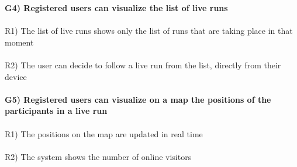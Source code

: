 \textbf{G4) Registered users can visualize the list of live runs} \\ \\
R1) The list of live runs shows only the list of runs that are taking place in that moment \\ \\
R2) The user can decide to follow a live run from the list, directly from their device \\ \\
\textbf{G5) Registered users can visualize on a map the positions of the participants in a live run} \\ \\	
R1) The positions on the map are updated in real time \\ \\
R2) The system shows the number of online visitors \\


